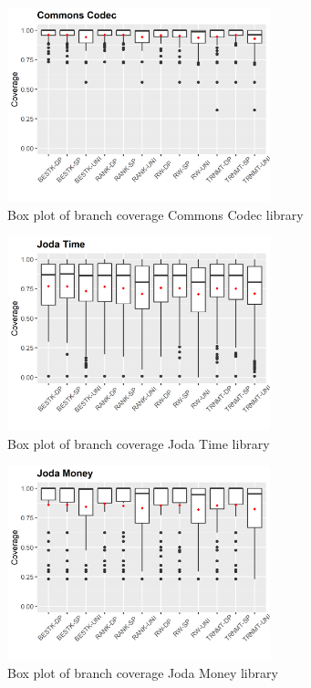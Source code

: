 \documentclass[sigconf]{acmart}
\begin{document}
\begin{figure}[h]
  \centering
  \includegraphics[width=3in]{../output/commons-codec-boxplot.png}
  \caption{Box plot of branch coverage Commons Codec library}
  \label{fig:boxplot3}
\end{figure}

\begin{figure}[h]
  \centering
  \includegraphics[width=3in]{../output/joda-time-boxplot.png}
  \caption{Box plot of branch coverage Joda Time library}
  \label{fig:boxplot4}
\end{figure}

\begin{figure}[h]
  \centering
  \includegraphics[width=3in]{../output/joda-money-boxplot.png}
  \caption{Box plot of branch coverage Joda Money library}
  \label{fig:boxplot5}
\end{figure}
\end{document}
